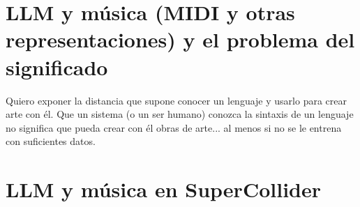 \section{LLM y música (MIDI y otras representaciones) y el problema del significado}
    Quiero exponer la distancia que supone conocer un lenguaje y usarlo para crear arte con él. Que un sistema (o un ser humano) conozca la sintaxis de un lenguaje no significa que pueda crear con él obras de arte... al menos si no se le entrena con suficientes datos.

\section{LLM y música en SuperCollider}